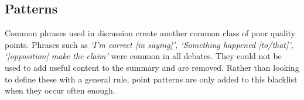     \subsection{Patterns}
      Common phrases used in discussion create another common class of poor quality points. Phrases such as \textit{`I'm correct [in saying]', `Something happened [to/that]', `[opposition] make the claim'} were common in all debates. They could not be used to add useful content to the summary and are removed. Rather than looking to define these with a general rule, point patterns are only added to this blacklist when they occur often enough.
